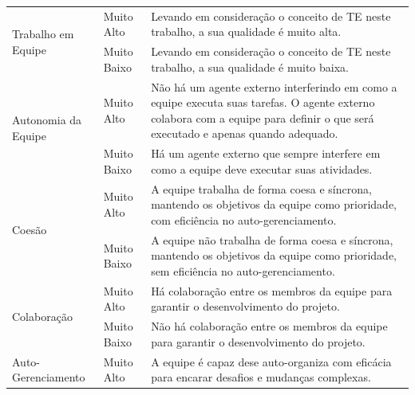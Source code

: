 \begin{center}
\begin{longtable}{
|p{0.30\dimexpr \textwidth-3\arrayrulewidth-3\tabcolsep\relax}|
 p{0.08\dimexpr \textwidth-3\arrayrulewidth-3\tabcolsep\relax}|
 p{0.62\dimexpr \textwidth-3\arrayrulewidth-3\tabcolsep\relax}|
}
\multirow{2}{*}{Trabalho em Equipe}           & Muito Alto  & Levando em consideração o conceito de TE neste trabalho, a sua qualidade é muito alta.                                                                                                \\ \cline{2-3}
                                              & Muito Baixo & Levando em consideração o conceito de TE neste trabalho, a sua qualidade é muito baixa.                                                                                               \\ \hline
\multirow{2}{*}{Autonomia da Equipe}          & Muito Alto  & Não há um agente externo interferindo em como a equipe executa suas tarefas. O agente externo colabora com a equipe para definir o que será executado e apenas quando adequado.       \\ \cline{2-3}
                                              & Muito Baixo & Há um agente externo que sempre interfere em como a equipe deve executar suas atividades.                                                                                             \\ \hline
\multirow{2}{*}{Coesão}                       & Muito Alto  & A equipe trabalha de forma coesa e síncrona, mantendo os objetivos da equipe como prioridade, com eficiência no auto-gerenciamento.                                                   \\ \cline{2-3}
                                              & Muito Baixo & A equipe não trabalha de forma coesa e síncrona, mantendo os objetivos da equipe como prioridade, sem eficiência no auto-gerenciamento.                                               \\ \hline
\multirow{2}{*}{Colaboração}                  & Muito Alto  & Há colaboração entre os membros da equipe para garantir o desenvolvimento do projeto.                                                                                                 \\ \cline{2-3}
                                              & Muito Baixo & Não há colaboração entre os membros da equipe para garantir o desenvolvimento do projeto.                                                                                             \\ \hline
\multirow{2}{*}{Auto-Gerenciamento}           & Muito Alto  & A equipe é capaz dese auto-organiza com eficácia para encarar desafios e mudanças complexas.                                                                                          \\ \cline{2-3}

\end{longtable}
\end{center}
